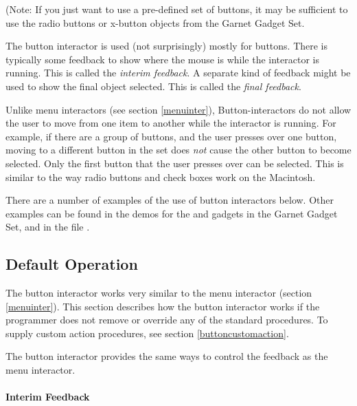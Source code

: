 \vspace{1 line}
(Note: If you
just want to use a pre-defined set of buttons, it may be sufficient to use
the radio buttons or x-button objects from the Garnet Gadget Set.

The button interactor is used (not surprisingly) mostly for buttons.  There is
typically some feedback to show where the mouse is while the interactor is
running.  This is called the {\it interim feedback}.  A separate kind of
feedback might be used to show the final object selected.  This is called
the {\it final feedback}.

Unlike menu interactors (see section \ref{menuinter}), Button-interactors
do not allow the user to move from one item to another while the interactor is
running.  For example, if there are a group of buttons, and the user
presses over one button, moving to a different button in the set does
{\it not} cause the other button to become selected.  Only the first button
that the user presses over can be selected.  This is similar to the way
radio buttons and check boxes work on the Macintosh.

There are a number of examples of the use of button interactors below.  Other
examples can be found in the demos for the  and 
gadgets in the Garnet Gadget Set, and in the file .

\subsection{Default Operation}

The button interactor works very similar to the menu interactor (section
\ref{menuinter}).
This section describes how the button interactor works
if the programmer does not remove or override any of the standard
 procedures.  To supply custom action procedures, see section
\ref{buttoncustomaction}.

The button interactor provides the same ways to control the feedback as the
menu interactor.

\paragraph{Interim Feedback}
\label{buttoninterimfeedback}

